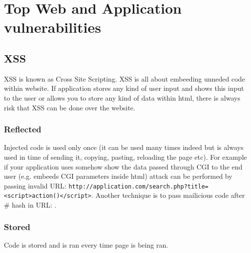 \documentclass{article}[12pt]
\begin{document}





\section{Top Web and Application vulnerabilities}




\subsection{XSS} XSS is known as Cross Site Scripting.
XSS is all about embeeding unneded code within website.
If application stores any kind of user input and shows this input to the user or allows you to store any kind of data within html, there is always risk that XSS can be done over the website.

\subsubsection{Reflected} Injected code is used only once (it can be used many times indeed but is always used in time of sending it, copying, pasting, reloading the page etc).
For example if your application uses somehow show the data passed through CGI to the end user (e.g. embeeds CGI parameters inside html) attack can be performed by passing invalid URL: \texttt{http://application.com/search.php?title=<script>action()</script>}.
Another technique is to pass mailicious code after \# hash in URL: \texttt{}.
\subsubsection{Stored}  Code is stored and is ran every time page is being ran.
\end{document}
